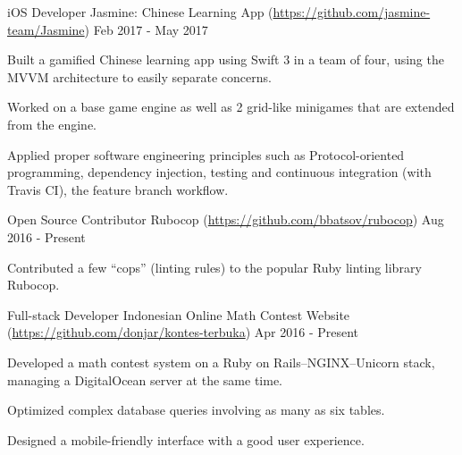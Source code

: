 

\begin{cventries}

	\cventry
	{iOS Developer} %
	{Jasmine: Chinese Learning App (\url{https://github.com/jasmine-team/Jasmine})} %
	{} %
	{Feb 2017 - May 2017} %
	{
		\begin{cvitems} %
		\item {Built a gamified Chinese learning app using Swift 3 in a team of four, using the MVVM architecture to easily separate concerns.}
		\item {Worked on a base game engine as well as 2 grid-like minigames that are extended from the engine.}
		\item {Applied proper software engineering principles such as Protocol-oriented programming, dependency injection, testing and continuous integration (with Travis CI), the feature branch workflow.}
		\end{cvitems}
	}

	\cventry
	{Open Source Contributor} %
	{Rubocop (\url{https://github.com/bbatsov/rubocop})} %
	{} %
	{Aug 2016 - Present} %
	{
		\begin{cvitems} %
		\item {Contributed a few ``cops'' (linting rules) to the popular Ruby linting library Rubocop.}
		\end{cvitems}
	}

	\cventry
	{Full-stack Developer} %
	{Indonesian Online Math Contest Website (\url{https://github.com/donjar/kontes-terbuka})} %
	{} %
	{Apr 2016 - Present} %
	{
		\begin{cvitems} %
		\item {Developed a math contest system on a Ruby on Rails--NGINX--Unicorn stack, managing a DigitalOcean server at the same time.}
		\item {Optimized complex database queries involving as many as six tables.}
		\item {Designed a mobile-friendly interface with a good user experience.}
		\end{cvitems}
	}

\end{cventries}
